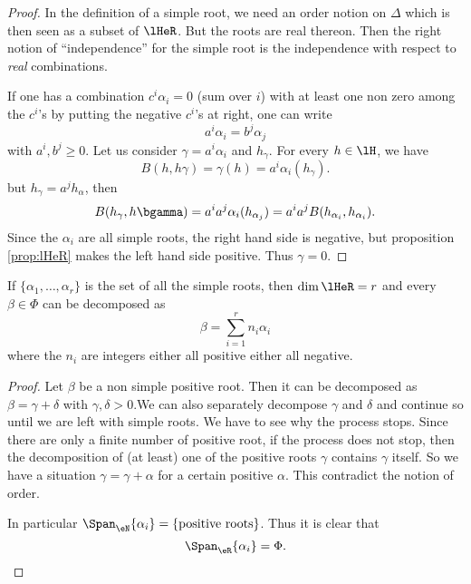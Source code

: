 \begin{proof}
    In the definition of a simple root, we need an order notion on $\Delta$ which is then seen as a subset of $\lHeR$. But the roots are real thereon. Then the right notion of ``independence''{} for the simple root is the independence with respect to \emph{real} combinations.

    If one has a combination $c^i\alpha_i=0$ (sum over $i$) with at least one non zero among the $c^i$'s  by putting the negative $c^i$'s at right, one can write
    \[
        a^i\alpha_i=b^j\alpha_j
    \]
    with $a^i,b^j\geq 0$. Let us consider $\gamma=a^i\alpha_i$ and $h_{\gamma}$. For every $h\in\lH$, we have
    \[
        B(h,h\gamma)=\gamma(h)=a^i\alpha_i(h_{\gamma}).
    \]
    but $h_{\gamma}=a^jh_{\alpha}$, then
    \begin{equation}
        B(h_{\gamma},h\bgamma)=a^ia^j\alpha_i(h_{\alpha_j})
                    =a^ia^jB(h_{\alpha_i},h_{\alpha_i}).
    \end{equation}
    Since the $\alpha_i$ are all simple roots, the right hand side is negative, but proposition \ref{prop:lHeR} makes the left hand side positive. Thus $\gamma=0$.
\end{proof}

\begin{theorem}
    If $\{\alpha_1,\ldots,\alpha_r\}$ is the set of all the simple roots, then $\dim\lHeR=r$ and every $\beta\in\Phi$ can be decomposed as
    \[
        \beta=\sum_{i=1}^rn_i\alpha_i
    \]
    where the $n_i$ are integers either all positive either all negative.
\end{theorem}

\begin{proof}
    Let $\beta$ be a non simple positive root. Then it can be decomposed as $\beta=\gamma+\delta$ with $\gamma,\delta>0$.We can also separately decompose $\gamma$ and $\delta$ and continue so until we are left with simple roots. We have to see why the process stops. Since there are only a finite number of positive root, if the process does not stop, then the decomposition of (at least) one of the positive roots $\gamma$ contains $\gamma$ itself. So we have a situation $\gamma=\gamma+\alpha$ for a certain positive $\alpha$. This contradict the notion of order.

    In particular $\Span_{\eN}\{\alpha_i\}=\{\textrm{positive roots}\}$. Thus it is clear that
    \[
        \Span_{\eR}\{\alpha_i\}=\Phi.
    \]
\end{proof}

